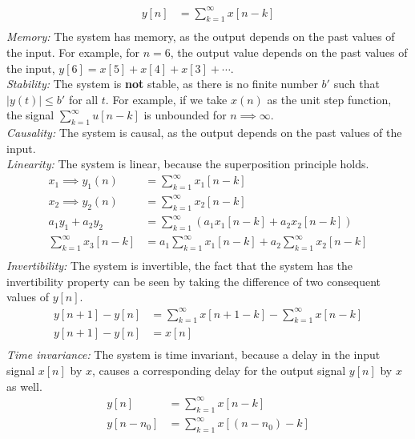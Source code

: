 \documentclass[10pt,a4paper, margin=1in]{article}
\begin{document}
\begin{enumerate}
\begin{enumerate}
        \begin{align*}
            y[n] & = \sum_{k = 1}^{\infty} x[n - k] \\
        \end{align*}
        \textit{Memory: } The system has memory, as the output depends on the past values of the input.
        For example, for $n = 6$, the output value depends on the past values of the input,
        $y[6] = x[5] + x[4] + x[3] + \cdots$.\\
        \textit{Stability: } The system is \textbf{not} stable, as there is no finite number $b'$ such that $|y(t)| \leq b'$ for all $t$.
        For example, if we take $x(n)$ as the unit step function, the signal $\sum_{k = 1}^{\infty} u[n - k]$ is unbounded for $n \implies \infty$.\\
        \textit{Causality: } The system is causal, as the output depends on the past values of the input.\\
        \textit{Linearity: } The system is linear, because the superposition principle holds.\\
        \begin{align*}
            x_1 \implies y_1(n) & = \sum_{k = 1}^{\infty} x_1[n - k] \\
            x_2 \implies y_2(n) & = \sum_{k = 1}^{\infty} x_2[n - k] \\
            a_1y_1 + a_2y_2 & = \sum_{k = 1}^{\infty} (a_1x_1[n - k] + a_2x_2[n - k])\\
            \sum_{k = 1}^{\infty} x_3[n - k] & = a_1\sum_{k = 1}^{\infty} x_1[n - k] + a_2\sum_{k = 1}^{\infty} x_2[n - k] \\ 
        \end{align*}
        \textit{Invertibility: } The system is invertible, the fact that the system has the invertibility property can be seen
        by taking the difference of two consequent values of $y[n]$.\\
        \begin{align*}
            y[n + 1] - y[n] & = \sum_{k = 1}^{\infty} x[n + 1 - k] - \sum_{k = 1}^{\infty} x[n - k]\\
            y[n + 1] - y[n] & = x[n]\\
        \end{align*}
        \textit{Time invariance: } The system is time invariant, because a delay in the input signal $x[n]$ by $x$, causes a
        corresponding delay for the output signal $y[n]$ by $x$ as well.\\
        \begin{align*}
            y[n] & = \sum_{k = 1}^{\infty} x[n - k] \\
            y[n- n_0] & = \sum_{k = 1}^{\infty} x[(n - n_0) - k]\\
        \end{align*}
        \end{enumerate}
    

\end{enumerate}
\end{document}
